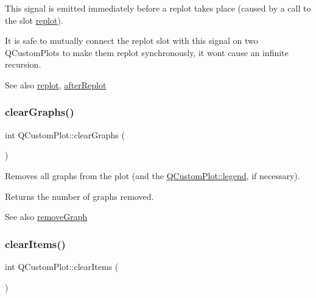 This signal is emitted immediately before a replot takes place (caused by a call to the slot \hyperlink{class_q_custom_plot_a606fd384b2a637ce2c24899bcbde77d6}{replot}).

It is safe to mutually connect the replot slot with this signal on two Q\+Custom\+Plots to make them replot synchronously, it won\textquotesingle{}t cause an infinite recursion.

\begin{DoxySeeAlso}{See also}
\hyperlink{class_q_custom_plot_a606fd384b2a637ce2c24899bcbde77d6}{replot}, \hyperlink{class_q_custom_plot_a6f4fa624af060bc5919c5f266cf426a0}{after\+Replot} 
\end{DoxySeeAlso}
\hypertarget{class_q_custom_plot_ab0f3abff2d2f7df3668b5836f39207fa}{}\label{class_q_custom_plot_ab0f3abff2d2f7df3668b5836f39207fa} 
\subsubsection{\texorpdfstring{clear\+Graphs()}{clearGraphs()}}
{\footnotesize\ttfamily int Q\+Custom\+Plot\+::clear\+Graphs (\begin{DoxyParamCaption}{ }\end{DoxyParamCaption})}

Removes all graphs from the plot (and the \hyperlink{class_q_custom_plot_a4eadcd237dc6a09938b68b16877fa6af}{Q\+Custom\+Plot\+::legend}, if necessary).

Returns the number of graphs removed.

\begin{DoxySeeAlso}{See also}
\hyperlink{class_q_custom_plot_a903561be895fb6528a770d66ac5e6713}{remove\+Graph} 
\end{DoxySeeAlso}
\hypertarget{class_q_custom_plot_abdfd07d4f0591d0cf967f85013fd3645}{}\label{class_q_custom_plot_abdfd07d4f0591d0cf967f85013fd3645} 
\subsubsection{\texorpdfstring{clear\+Items()}{clearItems()}}
{\footnotesize\ttfamily int Q\+Custom\+Plot\+::clear\+Items (\begin{DoxyParamCaption}{ }\end{DoxyParamCaption})}

